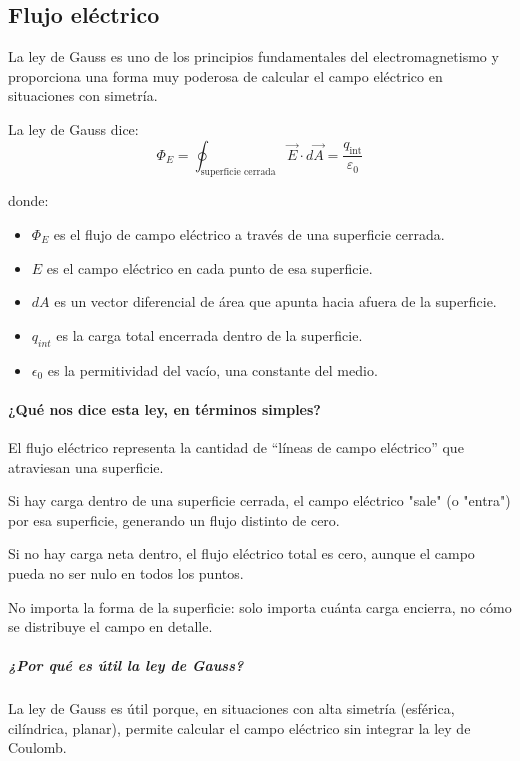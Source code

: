 \subsection{Flujo eléctrico}

La ley de Gauss es uno de los principios fundamentales del electromagnetismo y proporciona una forma muy poderosa de calcular el campo eléctrico en situaciones con simetría.

La ley de Gauss dice:
\begin{equation}
    \Phi_E = \oint_{\text{superficie cerrada}} \vec{E} \cdot d\vec{A} = \frac{q_{\text{int}}}{\varepsilon_0}
\end{equation}

donde:
\begin{itemize}
    \item \( \Phi_E \) es el flujo de campo eléctrico a través de una superficie cerrada.
    \item \(E\) es el campo eléctrico en cada punto de esa superficie.
    \item \(dA\) es un vector diferencial de área que apunta hacia afuera de la superficie.
    \item \(q_{int}\) es la carga total encerrada dentro de la superficie.
    \item \(\epsilon_0\) es la permitividad del vacío, una constante del medio.
\end{itemize}

\paragraph{¿Qué nos dice esta ley, en términos simples?}

El flujo eléctrico representa la cantidad de ``líneas de campo eléctrico'' que atraviesan una superficie.

Si hay carga dentro de una superficie cerrada, el campo eléctrico "sale" (o "entra") por esa superficie, generando un flujo distinto de cero.

Si no hay carga neta dentro, el flujo eléctrico total es cero, aunque el campo pueda no ser nulo en todos los puntos.

No importa la forma de la superficie: solo importa cuánta carga encierra, no cómo se distribuye el campo en detalle.

\subparagraph{¿Por qué es útil la ley de Gauss?}

La ley de Gauss es útil porque, en situaciones con alta simetría (esférica, cilíndrica, planar), permite calcular el campo eléctrico sin integrar la ley de Coulomb.


